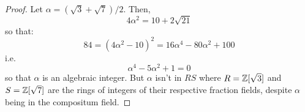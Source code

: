 \begin{proof} 
    Let $\alpha = (\sqrt{3}+\sqrt{7})/2$. Then,
    \[ 4\alpha^2 = 10+2\sqrt{21} \]
    so that:
    \[ 84 = (4\alpha^2-10)^2 = 16\alpha^4 - 80\alpha^2 + 100 \]
    i.e.
    \[ \alpha^4 - 5\alpha^2 + 1 = 0 \]
    so that $\alpha$ is an algebraic integer. But $\alpha$ isn't in $RS$ where $R = \mathbb{Z}[\sqrt{3}]$ and $S = \mathbb{Z}[\sqrt{7}]$ are the rings of integers of their respective fraction fields, despite $\alpha$ being in the compositum field.
\end{proof}
